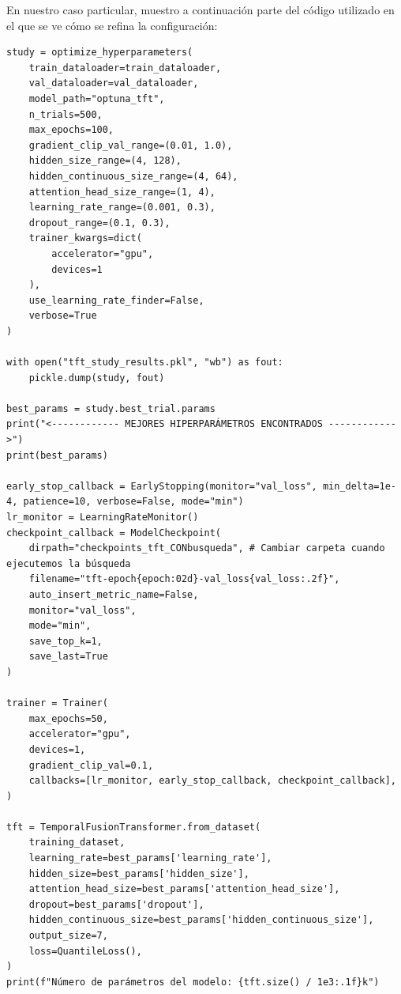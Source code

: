 En nuestro caso particular, muestro a continuación parte del código utilizado en el que se ve cómo se refina la configuración:
\begin{lstlisting}[caption={Código de implementación del modelo TFT.}, label = {TFT_model_implementacion}]
study = optimize_hyperparameters(
    train_dataloader=train_dataloader,
    val_dataloader=val_dataloader,
    model_path="optuna_tft", 
    n_trials=500,
    max_epochs=100,
    gradient_clip_val_range=(0.01, 1.0),
    hidden_size_range=(4, 128),
    hidden_continuous_size_range=(4, 64),
    attention_head_size_range=(1, 4),
    learning_rate_range=(0.001, 0.3),
    dropout_range=(0.1, 0.3),
    trainer_kwargs=dict(
        accelerator="gpu",
        devices=1
    ),
    use_learning_rate_finder=False,
    verbose=True
)

with open("tft_study_results.pkl", "wb") as fout:
    pickle.dump(study, fout)

best_params = study.best_trial.params
print("<------------ MEJORES HIPERPARÁMETROS ENCONTRADOS ------------>")
print(best_params)

early_stop_callback = EarlyStopping(monitor="val_loss", min_delta=1e-4, patience=10, verbose=False, mode="min")
lr_monitor = LearningRateMonitor()
checkpoint_callback = ModelCheckpoint(
    dirpath="checkpoints_tft_CONbusqueda", # Cambiar carpeta cuando ejecutemos la búsqueda
    filename="tft-epoch{epoch:02d}-val_loss{val_loss:.2f}",
    auto_insert_metric_name=False,
    monitor="val_loss",
    mode="min",        
    save_top_k=1,      
    save_last=True     
)

trainer = Trainer(
    max_epochs=50,
    accelerator="gpu",
    devices=1,
    gradient_clip_val=0.1,
    callbacks=[lr_monitor, early_stop_callback, checkpoint_callback],
)

tft = TemporalFusionTransformer.from_dataset(
    training_dataset,
    learning_rate=best_params['learning_rate'],
    hidden_size=best_params['hidden_size'],
    attention_head_size=best_params['attention_head_size'],
    dropout=best_params['dropout'],
    hidden_continuous_size=best_params['hidden_continuous_size'],
    output_size=7,
    loss=QuantileLoss(),
)
print(f"Número de parámetros del modelo: {tft.size() / 1e3:.1f}k")
\end{lstlisting} 
%
%
%
